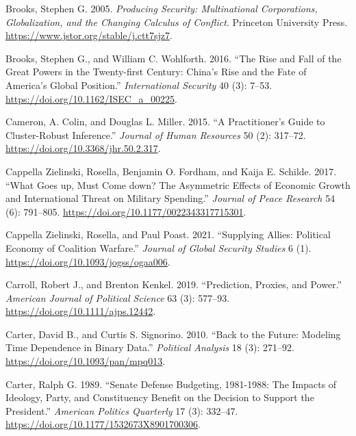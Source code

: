 \documentclass[
  12,
  letterpaper,
  DIV=11,
  numbers=noendperiod]{scrartcl}
\newlength{\cslhangindent}
\newlength{\cslentryspacingunit} %
\newenvironment{CSLReferences}[2] %
 {%
  \setlength{\parindent}{0pt}
  \ifodd #1
  \let\oldpar\par
  \def\par{\hangindent=\cslhangindent\oldpar}
  \fi
  \setlength{\parskip}{#2\cslentryspacingunit}
 }%
 {}
\begin{document}
\begin{CSLReferences}{1}{0}
\leavevmode{}%
Brooks, Stephen G. 2005. \emph{Producing {Security}: {Multinational
Corporations}, {Globalization}, and the {Changing Calculus} of
{Conflict}}. {Princeton University Press}.
\url{https://www.jstor.org/stable/j.ctt7sjz7}.

\leavevmode{}%
Brooks, Stephen G., and William C. Wohlforth. 2016. {``The {Rise} and
{Fall} of the {Great Powers} in the {Twenty-first Century}: {China}'s
{Rise} and the {Fate} of {America}'s {Global Position}.''}
\emph{International Security} 40 (3): 7--53.
\url{https://doi.org/10.1162/ISEC_a_00225}.

\leavevmode{}%
Cameron, A. Colin, and Douglas L. Miller. 2015. {``A {Practitioner}'s
{Guide} to {Cluster-Robust Inference}.''} \emph{Journal of Human
Resources} 50 (2): 317--72. \url{https://doi.org/10.3368/jhr.50.2.317}.

\leavevmode{}%
Cappella Zielinski, Rosella, Benjamin O. Fordham, and Kaija E. Schilde.
2017. {``What Goes up, Must Come down? {The} Asymmetric Effects of
Economic Growth and International Threat on Military Spending.''}
\emph{Journal of Peace Research} 54 (6): 791--805.
\url{https://doi.org/10.1177/0022343317715301}.

\leavevmode{}%
Cappella Zielinski, Rosella, and Paul Poast. 2021. {``Supplying
{Allies}: {Political Economy} of {Coalition Warfare}.''} \emph{Journal
of Global Security Studies} 6 (1).
\url{https://doi.org/10.1093/jogss/ogaa006}.

\leavevmode{}%
Carroll, Robert J., and Brenton Kenkel. 2019. {``Prediction, {Proxies},
and {Power}.''} \emph{American Journal of Political Science} 63 (3):
577--93. \url{https://doi.org/10.1111/ajps.12442}.

\leavevmode{}%
Carter, David B., and Curtis S. Signorino. 2010. {``Back to the
{Future}: {Modeling Time Dependence} in {Binary Data}.''}
\emph{Political Analysis} 18 (3): 271--92.
\url{https://doi.org/10.1093/pan/mpq013}.

\leavevmode{}%
Carter, Ralph G. 1989. {``Senate {Defense Budgeting}, 1981-1988: {The
Impacts} of {Ideology}, {Party}, and {Constituency Benefit} on the
{Decision} to {Support} the {President}.''} \emph{American Politics
Quarterly} 17 (3): 332--47.
\url{https://doi.org/10.1177/1532673X8901700306}.


\end{CSLReferences}
\end{document}
